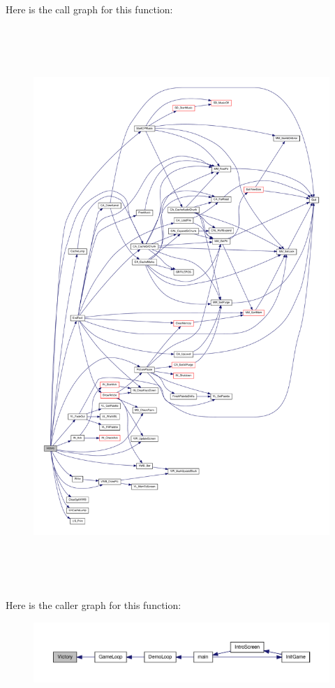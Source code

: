Here is the call graph for this function:
\nopagebreak
\begin{figure}[H]
\begin{center}
\leavevmode
\includegraphics[height=600pt]{WL__INTER_8C_aaa41fd21f2b55e23622375ac43624b99_cgraph}
\end{center}
\end{figure}




Here is the caller graph for this function:
\nopagebreak
\begin{figure}[H]
\begin{center}
\leavevmode
\includegraphics[width=400pt]{WL__INTER_8C_aaa41fd21f2b55e23622375ac43624b99_icgraph}
\end{center}
\end{figure}


